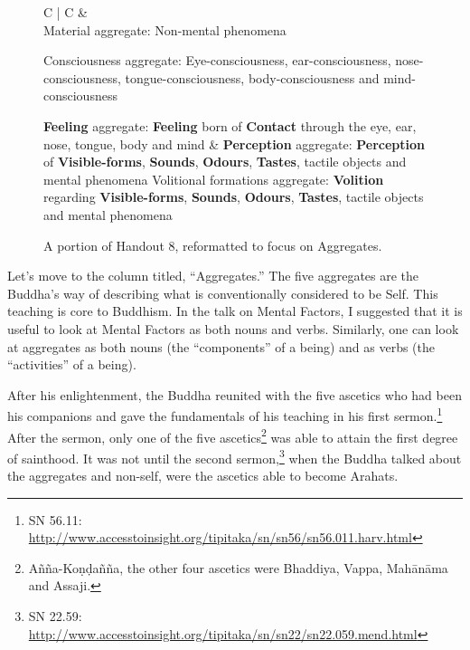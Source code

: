 \begin{figure}[H]
\begin{tabular*}{\textwidth}{C{\tabcolsep} | C{\tabcolsep}}
\toprule
{} &  \\
\midrule
Material aggregate:\newline
  Non-mental phenomena\newline\vspace{5mm}
  
  Consciousness aggregate:\newline
  Eye-consciousness, ear-consciousness, nose-consciousness, tongue-consciousness, body-consciousness and mind-consciousness\newline\vspace{5mm}
  
  \textbf{Feeling} aggregate:\newline
    \textbf{Feeling} born of \textbf{Contact} through the eye, ear, nose, tongue, body and mind
  &
  \textbf{Perception} aggregate:\newline
    \textbf{Perception} of \textbf{Visible-forms}, \textbf{Sounds}, \textbf{Odours}, \textbf{Tastes}, tactile objects and mental phenomena
    \newline\vspace{5mm}
    Volitional formations aggregate:\newline
    \textbf{Volition} regarding \textbf{Visible-forms}, \textbf{Sounds}, \textbf{Odours}, \textbf{Tastes}, tactile objects and mental phenomena
  \\
  
\bottomrule
\end{tabular*}
\caption{A portion of Handout 8, reformatted to focus on Aggregates.}
\end{figure}

Let’s move to the column titled, “Aggregates.” The five aggregates are the Buddha’s way of describing what is conventionally considered to be Self. This teaching is core to Buddhism. In the talk on Mental Factors, I suggested that it is useful to look at Mental Factors as both nouns and verbs. Similarly, one can look at aggregates as both nouns (the “components” of a being) and as verbs (the “activities” of a being).

After his enlightenment, the Buddha reunited with the five ascetics who had been his companions and gave the fundamentals of his teaching in his first sermon.\footnote{SN 56.11: \url{http://www.accesstoinsight.org/tipitaka/sn/sn56/sn56.011.harv.html}} After the sermon, only one of the five ascetics\footnote{Añña-Koṇḍañña, the other four ascetics were Bhaddiya, Vappa, Mahānāma and Assaji.} was able to attain the first degree of sainthood. It was not until the second sermon,\footnote{SN 22.59: \url{http://www.accesstoinsight.org/tipitaka/sn/sn22/sn22.059.mend.html}} when the Buddha talked about the aggregates and non-self, were the ascetics able to become Arahats.

